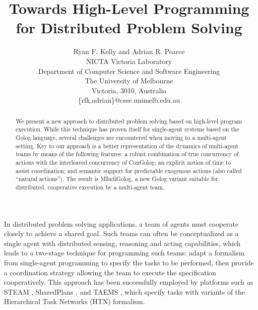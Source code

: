 \documentclass[times, 10pt, twocolumn]{article}
\begin{document}
\title{Towards High-Level Programming for Distributed Problem Solving}

\author{Ryan F. Kelly and Adrian R. Pearce\\
 NICTA Victoria Laboratory\\
 Department of Computer Science and Software Engineering\\
 The University of Melbourne\\
 Victoria, 3010, Australia\\
 \{rfk,adrian\}@csse.unimelb.edu.au}

\maketitle
\thispagestyle{empty}

\begin{abstract}
We present a new approach to distributed problem solving based on
high-level program execution. While this technique has proven itself
for single-agent systems based on the Golog language, several challenges
are encountered when moving to a multi-agent setting. Key to our approach
is a better representation of the dynamics of multi-agent teams by
means of the following features: a robust combination of true concurrency
of actions with the interleaved concurrency of ConGolog; an explicit
notion of time to assist coordination; and semantic support for predictable
exogenous actions (also called {}``natural actions''). The result
is MIndiGolog, a new Golog variant suitable for distributed, cooperative
execution by a multi-agent team. 
\end{abstract}


In distributed problem solving applications, a team of agents must
cooperate closely to achieve a shared goal. Such teams can often be
conceptualized as a single agent with distributed sensing, reasoning
and acting capabilities, which leads to a two-stage technique for
programming such teams: adapt a formalism from single-agent programming
to specify the tasks to be performed, then provide a coordination
strategy allowing the team to execute the specification cooperatively.
This approach has been successfully employed by platforms such as
STEAM \cite{tambe97flexible_teamwork}, SharedPlans \cite{grosz99planning_together},
and TAEMS \cite{decker95designing_coordination}, which specify tasks
with variants of the Hierarchical Task Networks (HTN) formalism.
\end{document}

